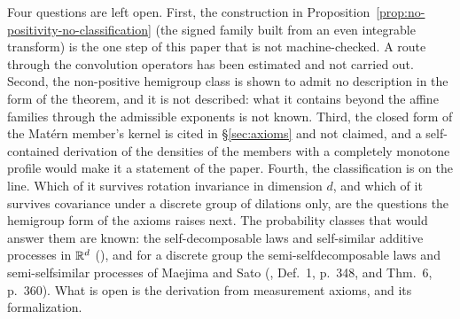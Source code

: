 Four questions are left open. First, the construction in
Proposition~\ref{prop:no-positivity-no-classification} (the signed family built from an
even integrable transform) is the one step of this paper that is not machine-checked. A
route through the convolution operators has been estimated and not carried out. Second, the
non-positive hemigroup class is shown to admit no description in the form of the theorem,
and it is not described: what it contains beyond the affine families through the admissible
exponents is not known. Third,
the closed form of the Mat\'ern member's kernel is cited in \S\ref{sec:axioms} and not
claimed, and a self-contained derivation of the densities of the members with a completely
monotone profile would make it a statement of the paper.
Fourth, the classification is on the line. Which of it survives rotation invariance in
dimension $d$, and which of it survives covariance under a discrete group of dilations only,
are the questions the hemigroup form of the axioms raises next. The probability classes
that would answer them are known: the self-decomposable laws and self-similar additive
processes in $\mathbb{R}^d$ (), and for a discrete group the
semi-selfdecomposable laws and semi-selfsimilar processes of Maejima and Sato
(, Def.~1, p.~348, and Thm.~6, p.~360). What is open is the
derivation from measurement axioms, and its formalization.
